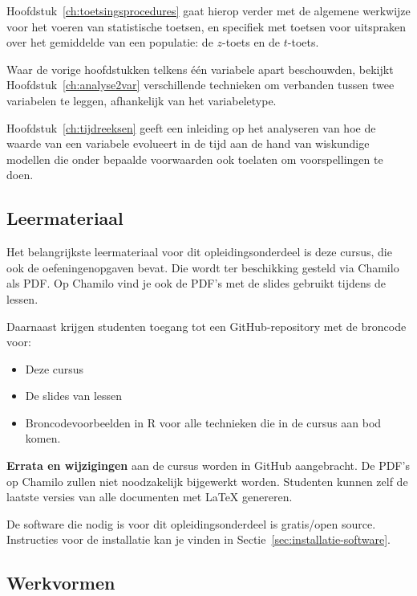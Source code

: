 Hoofdstuk~\ref{ch:toetsingsprocedures} gaat hierop verder met de algemene werkwijze voor het voeren van statistische toetsen, en specifiek met toetsen voor uitspraken over het gemiddelde van een populatie: de $z$-toets en de $t$-toets.

Waar de vorige hoofdstukken telkens één variabele apart beschouwden, bekijkt Hoofdstuk~\ref{ch:analyse2var} verschillende technieken om verbanden tussen twee variabelen te leggen, afhankelijk van het variabeletype.


Hoofdstuk~\ref{ch:tijdreeksen} geeft een inleiding op het analyseren van hoe de waarde van een variabele evolueert in de tijd aan de hand van wiskundige modellen die onder bepaalde voorwaarden ook toelaten om voorspellingen te doen.

\subsection{Leermateriaal}

Het belangrijkste leermateriaal voor dit opleidingsonderdeel is deze cursus, die ook de oefeningenopgaven bevat. Die wordt ter beschikking gesteld via Chamilo als PDF. Op Chamilo vind je ook de PDF's met de slides gebruikt tijdens de lessen.

Daarnaast krijgen studenten toegang tot een GitHub-repository met de broncode voor:

\begin{itemize}
  \item Deze cursus
  \item De slides van lessen
  \item Broncodevoorbeelden in R voor alle technieken die in de cursus aan bod komen.
\end{itemize}

\textbf{Errata en wijzigingen} aan de cursus worden in GitHub aangebracht. De PDF's op Chamilo zullen niet noodzakelijk bijgewerkt worden. Studenten kunnen zelf de laatste versies van alle documenten met \LaTeX{} genereren.

De software die nodig is voor dit opleidingsonderdeel is gratis/open source. Instructies voor de installatie kan je vinden in Sectie~\ref{sec:installatie-software}.

\subsection{Werkvormen}

